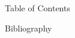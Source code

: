 \documentclass{beamer}
\title{}
\subtitle{}
\author{Valentin Churavy}
\institute[CSAIL]{JuliaLab@CSAIL}
\date{16. May 2018}
\begin{document}
  \begin{frame}[plain]
    \titlepage
  \end{frame}
  \begin{frame}{Table of Contents}
    \tableofcontents[hideallsubsections]
  \end{frame}
\begin{frame}[allowframebreaks]{Bibliography}
  \printbibliography
\end{frame}
\end{document}

